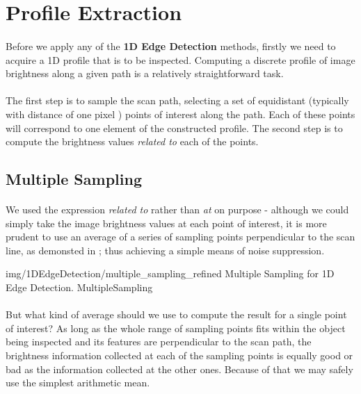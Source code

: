 \section{Profile Extraction}

\paragraph*{}
Before we apply any of the \textbf{1D Edge Detection} methods, firstly we need to acquire a 1D profile that is to be inspected. Computing a discrete profile of image brightness along a given path is a relatively straightforward task.

\paragraph*{}
The first step is to sample the scan path, selecting a set of equidistant (typically with distance of one pixel \cite[p. 150]{MVTec08}) points of interest along the path. Each of these points will correspond to one element of the constructed profile. The second step is to compute the brightness values \textit{related to} each of the points.

\subsection{Multiple Sampling}
\paragraph*{}
We used the expression \textit{related to} rather than \textit{at} on purpose - although we could simply take the image brightness values at each point of interest, it is more prudent to use an average of a series of sampling points perpendicular to the scan line, as demonsted in ; thus achieving a simple means of noise suppression. 

\oneFigure
{img/1DEdgeDetection/multiple_sampling_refined}
{Multiple Sampling for 1D Edge Detection.}
{MultipleSampling}
{\basicWidth}

\paragraph*{}
But what kind of average should we use to compute the result for a single point of interest? As long as the whole range of sampling points fits within the object being inspected and its features are perpendicular to the scan path, the brightness information collected at each of the sampling points is equally good or bad as the information collected at the other ones. Because of that we may safely use the simplest arithmetic mean.

